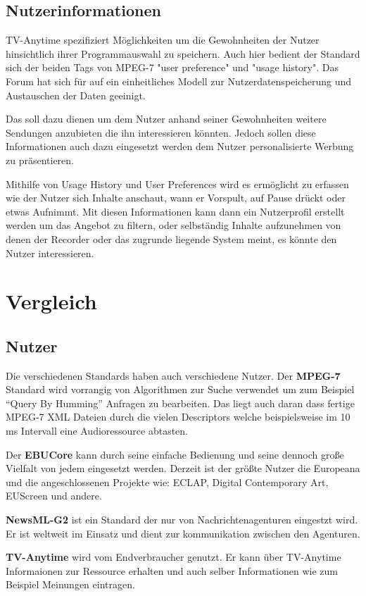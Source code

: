 \subsection{Nutzerinformationen} 
	TV-Anytime spezifiziert Möglichkeiten um die Gewohnheiten der Nutzer hinsichtlich ihrer Programmauswahl zu speichern. Auch hier bedient der Standard sich der beiden Tags von MPEG-7 "user preference" und "usage history". Das Forum hat sich für auf ein einheitliches Modell zur Nutzerdatenspeicherung und Austauschen der Daten geeinigt.
	
	Das soll dazu dienen um dem Nutzer anhand seiner Gewohnheiten weitere Sendungen anzubieten die ihn interessieren könnten. Jedoch sollen diese Informationen auch dazu eingesetzt werden dem Nutzer personalisierte Werbung zu präsentieren.
	
	Mithilfe von Usage History und User Preferences wird es ermöglicht zu erfassen wie der Nutzer sich Inhalte anschaut, wann er Vorspult, auf Pause drückt oder etwas Aufnimmt. Mit diesen Informationen kann dann ein Nutzerprofil erstellt werden um das Angebot zu filtern, oder selbständig Inhalte aufzunehmen von denen der Recorder oder das zugrunde liegende System meint, es könnte den Nutzer interessieren.
	\section{Vergleich}
	\subsection{Nutzer}
	Die verschiedenen Standards haben auch verschiedene Nutzer. Der \textbf{MPEG-7} Standard wird vorrangig von Algorithmen zur Suche verwendet um zum Beispiel \enquote{Query By Humming} Anfragen zu bearbeiten. Das liegt auch daran dass fertige MPEG-7 XML Dateien durch die vielen Descriptors welche beispielsweise im 10 ms Intervall eine Audioressource abtasten.
	
	Der \textbf{EBUCore} kann durch seine einfache Bedienung und seine dennoch große Vielfalt von jedem eingesetzt werden. Derzeit ist der größte Nutzer die Europeana und die angeschlossenen Projekte wie: ECLAP, Digital Contemporary Art, EUScreen und andere.
	
	\textbf{NewsML-G2} ist ein Standard der nur von Nachrichtenagenturen eingestzt wird. Er ist weltweit im Einsatz und dient zur kommunikation zwischen den Agenturen.
	
	\textbf{TV-Anytime} wird vom Endverbraucher genutzt. Er kann über TV-Anytime Informaionen zur Ressource erhalten und auch selber Informationen wie zum Beispiel Meinungen eintragen.

